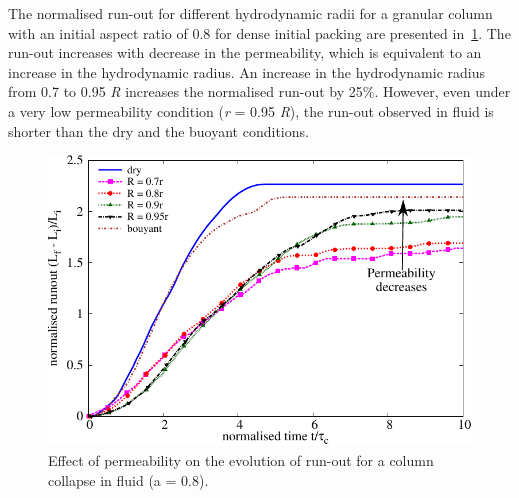 \documentclass[12pt,a4paper,twocolumn,fleqn]{narms}
\begin{document}
The normalised run-out for different hydrodynamic radii for a granular column 
with an initial aspect ratio of 0.8 for dense initial packing are presented 
in~\cref{fig:Runout_a08_dense}. The run-out increases with decrease in the 
permeability, which is equivalent to an increase in the hydrodynamic radius. 
An increase in the hydrodynamic radius from 0.7 to 0.95 \textit{R} increases 
the normalised run-out by 25\%. However, even under a very low permeability 
condition (\textit{r} = 0.95 \textit{R}), the run-out observed in fluid is 
shorter than the dry and the buoyant conditions. 

\begin{figure}[htpb]
\centering
\includegraphics[width=0.9\linewidth]{figs/Runout_a08_dense}
\caption{Effect of permeability on the evolution of run-out for a column 
collapse in fluid (a = 0.8).}
\label{fig:Runout_a08_dense}
\end{figure}
\end{document}
